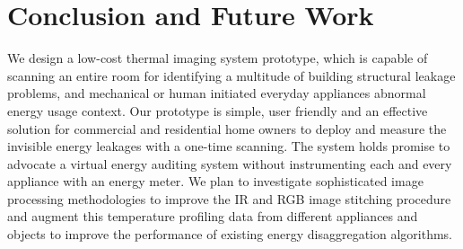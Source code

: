 \section{Conclusion and Future Work}
\label{sec:concl}

We design a low-cost thermal imaging system prototype, {\IRLeak}  which is capable of scanning an entire room for identifying a multitude of building structural leakage problems, and mechanical or human initiated everyday appliances abnormal energy usage context. Our prototype is simple, user friendly and an effective solution for commercial and residential home owners to deploy and measure the invisible energy leakages with a one-time scanning. The {\IRLeak} system holds promise to advocate a virtual energy auditing system without instrumenting each and every appliance with an energy meter. We plan to investigate sophisticated image processing methodologies to improve the IR and RGB image stitching procedure and augment this temperature profiling data from different appliances and objects to improve the performance of existing energy disaggregation algorithms.

